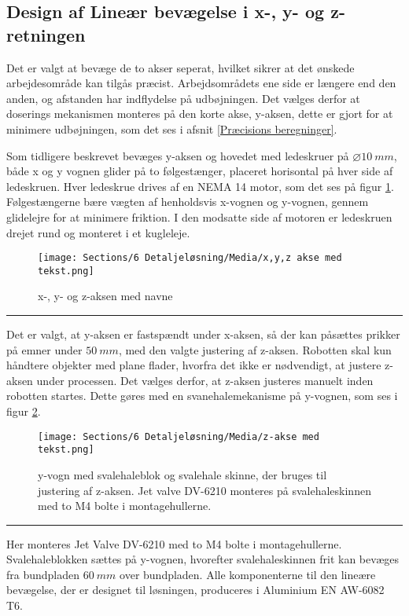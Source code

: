 \subsection{Design af Lineær bevægelse i x-, y- og z-retningen} \label{Design af Lineær bevægelse i x-, y- og z-retningen}

Det er valgt at bevæge de to akser seperat, hvilket sikrer at det ønskede arbejdesområde kan tilgås præcist. Arbejdsområdets ene side er længere end den anden, og afstanden har indflydelse på udbøjningen. Det vælges derfor at doserings mekanismen monteres på den korte akse, y-aksen, dette er gjort for at minimere udbøjningen, som det ses i afsnit \ref{Præcisions beregninger}.

Som tidligere beskrevet bevæges y-aksen og hovedet med ledeskruer på $\diameter\SI{10}{mm}$, både x og y vognen glider på to følgestænger, placeret horisontal på hver side af ledeskruen. Hver ledeskrue drives af en NEMA 14 motor, som det ses på figur \ref{fig:xyz akse med navne}. Følgestængerne bære vægten af henholdsvis x-vognen og y-vognen, gennem glidelejre for at minimere friktion. I den modsatte side af motoren er ledeskruen drejet rund og monteret i et kugleleje.


\begin{figure}[H]
    \centering
    \texttt{[image: Sections/6 Detaljeløsning/Media/x,y,z akse med tekst.png]}
    \caption{x-, y- og z-aksen med navne}
    \label{fig:xyz akse med navne}
\end{figure} \plainbreak{-0.5}
 
Det er valgt, at y-aksen er fastspændt under x-aksen, så der kan påsættes prikker på emner under \(\SI{50}{mm}\), med den valgte justering af z-aksen. Robotten skal kun håndtere objekter med plane flader, hvorfra det ikke er nødvendigt, at justere z-aksen under processen. Det vælges derfor, at z-aksen justeres manuelt inden robotten startes. Dette gøres med en svanehalemekanisme på y-vognen, som ses i figur \ref{fig:z-akse justering}.

\begin{figure}[H]
    \centering
    \texttt{[image: Sections/6 Detaljeløsning/Media/z-akse med tekst.png]}
    \caption{y-vogn med svalehaleblok og svalehale skinne, der bruges til justering af z-aksen. Jet valve DV-6210 monteres på svalehaleskinnen med to M4 bolte i montagehullerne.}
    \label{fig:z-akse justering}
\end{figure} \plainbreak{-0.5}

Her monteres Jet Valve DV-6210 med to M4 bolte i montagehullerne. Svalehaleblokken sættes på y-vognen, hvorefter svalehaleskinnen frit kan bevæges fra bundpladen \(\SI{60}{mm}\) over bundpladen. Alle komponenterne til den lineære bevægelse, der er designet til løsningen, produceres i Aluminium EN AW-6082 T6.

